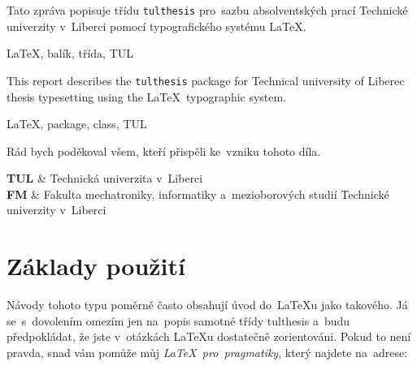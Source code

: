 \documentclass[a4paper,11pt,fonts,numbering,twoside,margins,listingsleft]{./tulpackage/tulthesis}
\newcommand{\argument}[1]{{\ttfamily\color{\tulcolor}#1}}
\begin{document}

\begin{abstractCZ}
    Tato zpráva popisuje třídu \thinspace\texttt{tulthesis}\thinspace{} pro~sazbu absolventských prací Technické univerzity v~Liberci pomocí typografického systému \LaTeX.
\end{abstractCZ}

\begin{keywordsCZ}
    \LaTeX, balík, třída, TUL
\end{keywordsCZ}

\vspace{2cm}

\begin{abstractEN}
    This report describes the \thinspace\texttt{tulthesis}\thinspace{} package for Technical university of Liberec thesis typesetting using the \LaTeX\ typographic system.
\end{abstractEN}

\begin{keywordsEN}
    \LaTeX, package, class, TUL
\end{keywordsEN}

\clearpage

\begin{acknowledgement}
    Rád bych poděkoval všem, kteří přispěli ke~vzniku tohoto díla.
\end{acknowledgement}

\TULthesisTOC{}

\clearpage

\listoffigures%
\vspace{10em}
\listoftables%
\clearpage
\listoflistings%
\clearpage

\begin{abbreviations}
    \textbf{TUL} & Technická univerzita v~Liberci \\
    \textbf{FM} & Fakulta mechatroniky, informatiky a~mezioborových studií Technické univerzity v~Liberci \\
\end{abbreviations}

\cleardoublepage%

\chapter{Základy použití}

Návody tohoto typu poměrně často obsahují úvod do~\LaTeX{}u jako takového.
Já se~s~dovolením omezím jen na~popis samotné třídy \argument{tulthesis}
a~budu předpokládat, že jste v~otázkách \LaTeX{}u dostatečně zorientováni.
Pokud to není pravda, snad vám pomůže můj \emph{\LaTeX\ pro~pragmatiky}, který
najdete na~adrese:
\end{document}
